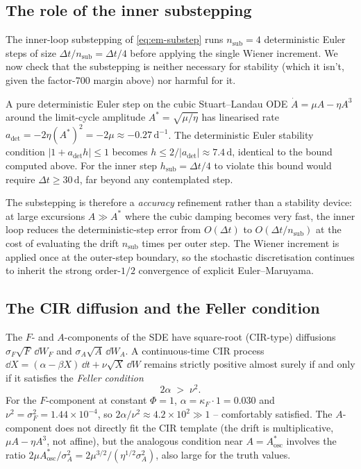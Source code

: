\subsection{The role of the inner substepping}\label{app:num-stab-substep}

The inner-loop substepping of \eqref{eq:em-substep} runs
$n_{\mathrm{sub}} = 4$ deterministic Euler steps of size
$\Delta t / n_{\mathrm{sub}} = \Delta t / 4$ before applying the
single Wiener increment. We now check that the substepping is
neither necessary for stability (which it isn't, given the
factor-700 margin above) nor harmful for it.

A pure deterministic Euler step on the cubic Stuart--Landau ODE
$\dot A = \mu A - \eta A^3$ around the limit-cycle amplitude
$A^* = \sqrt{\mu/\eta}$ has linearised rate
$a_{\mathrm{det}} = -2\eta(A^*)^2 = -2\mu \approx -0.27\,\mathrm{d}^{-1}$.
The deterministic Euler stability condition $|1 + a_{\mathrm{det}} h| \le 1$
becomes $h \le 2/|a_{\mathrm{det}}| \approx 7.4\,\mathrm{d}$, identical
to the bound computed above. For the inner step $h_{\mathrm{sub}} = \Delta t / 4$
to violate this bound would require $\Delta t \ge 30\,\mathrm{d}$, far
beyond any contemplated step.

The substepping is therefore a \emph{accuracy} refinement rather
than a stability device: at large excursions $A \gg A^*$ where the
cubic damping becomes very fast, the inner loop reduces the
deterministic-step error from $O(\Delta t)$ to
$O(\Delta t / n_{\mathrm{sub}})$ at the cost of evaluating the drift
$n_{\mathrm{sub}}$ times per outer step. The Wiener increment is
applied once at the outer-step boundary, so the stochastic
discretisation continues to inherit the strong order-$1/2$
convergence of explicit Euler--Maruyama.

\subsection{The CIR diffusion and the Feller condition}\label{app:num-stab-feller}

The $F$- and $A$-components of the SDE have square-root (CIR-type)
diffusions $\sigma_F\sqrt F\,\dd W_F$ and $\sigma_A\sqrt A\,\dd W_A$.
A continuous-time CIR process
$\dd X = (\alpha - \beta X)\,\dd t + \nu\sqrt X\,\dd W$ remains
strictly positive almost surely if and only if it satisfies the
\emph{Feller condition}
\begin{equation}
  2\alpha \;>\; \nu^2.
  \label{eq:feller}
\end{equation}
For the $F$-component at constant $\Phi = 1$,
$\alpha = \kappa_F \cdot 1 = 0.030$ and $\nu^2 = \sigma_F^2 = 1.44 \times 10^{-4}$,
so $2\alpha/\nu^2 \approx 4.2 \times 10^2 \gg 1$ -- comfortably
satisfied. The $A$-component does not directly fit the CIR template
(the drift is multiplicative, $\mu A - \eta A^3$, not affine), but
the analogous condition near $A = A^*_{\mathrm{osc}}$ involves the
ratio $2\mu A^*_{\mathrm{osc}}/\sigma_A^2 = 2\mu^{3/2}/(\eta^{1/2}\sigma_A^2)$,
also large for the truth values.

